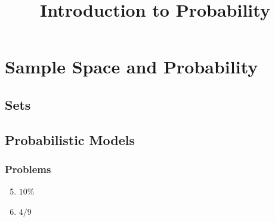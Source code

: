 \documentclass{article} \usepackage[margin=1in]{geometry}
\title{Introduction to Probability} \author{} \date{}
\begin{document}
\maketitle
\section{Sample Space and Probability}
\subsection{Sets}
\subsection{Probabilistic Models}
\subsubsection*{Problems}
\begin{enumerate}
	\setcounter{enumi}{4}
	\item $10\%$
	\item $4/9$
\end{enumerate}
\end{document}
